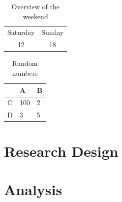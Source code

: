 \documentclass[11pt, a4paper]{article} %
\begin{document}
\blindtext %

\begin{table}[] %
    \centering
    \begin{tabular}{c|c}
        Saturday & Sunday \\
        12 & 18
    \end{tabular}
    \caption{Overview of the weekend}%
    \label{tab:weekend} %
\end{table}

\begin{table}[] %
    \centering
\begin{tabular}{@{}lll@{}}
\toprule
  & A   & B \\ \midrule
C & 100 & 2 \\
D & 3   & 5 \\ \bottomrule
\end{tabular}
    \caption{Random numbers} %
    \label{tab:numbers} %
\end{table}


\section{Research Design}

\blindtext %


\section{Analysis}

\blindtext %

\end{document}

